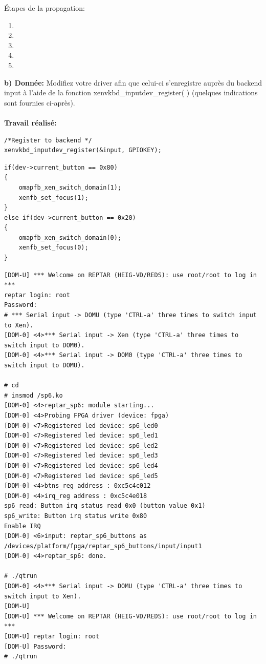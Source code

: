 Étapes de la propagation:
\begin{enumerate}
	\item
	\item
	\item
	\item
	\item
\end{enumerate}
\textbf{b) Donnée: }Modifiez votre driver afin que celui-ci s'enregistre auprès du backend input à l'aide de la fonction
xenvkbd\_inputdev\_register( ) (quelques indications sont fournies ci-après).\\\\
\textbf{Travail réalisé: }
\begin{lstlisting}
/*Register to backend */
xenvkbd_inputdev_register(&input, GPIOKEY);
\end{lstlisting}
\begin{lstlisting}
if(dev->current_button == 0x80)
{
	omapfb_xen_switch_domain(1);
	xenfb_set_focus(1);
}
else if(dev->current_button == 0x20)
{
	omapfb_xen_switch_domain(0);
	xenfb_set_focus(0);
}
\end{lstlisting}
\begin{lstlisting}
[DOM-U] *** Welcome on REPTAR (HEIG-VD/REDS): use root/root to log in ***
reptar login: root
Password: 
# *** Serial input -> DOMU (type 'CTRL-a' three times to switch input to Xen).
[DOM-0] <4>*** Serial input -> Xen (type 'CTRL-a' three times to switch input to DOM0).
[DOM-0] <4>*** Serial input -> DOM0 (type 'CTRL-a' three times to switch input to DOMU).

# cd
# insmod /sp6.ko 
[DOM-0] <4>reptar_sp6: module starting...
[DOM-0] <4>Probing FPGA driver (device: fpga)
[DOM-0] <7>Registered led device: sp6_led0
[DOM-0] <7>Registered led device: sp6_led1
[DOM-0] <7>Registered led device: sp6_led2
[DOM-0] <7>Registered led device: sp6_led3
[DOM-0] <7>Registered led device: sp6_led4
[DOM-0] <7>Registered led device: sp6_led5
[DOM-0] <4>btns_reg address : 0xc5c4c012
[DOM-0] <4>irq_reg address : 0xc5c4e018
sp6_read: Button irq status read 0x0 (button value 0x1)
sp6_write: Button irq status write 0x80
Enable IRQ
[DOM-0] <6>input: reptar_sp6_buttons as /devices/platform/fpga/reptar_sp6_buttons/input/input1
[DOM-0] <4>reptar_sp6: done.

# ./qtrun
[DOM-0] <4>*** Serial input -> DOMU (type 'CTRL-a' three times to switch input to Xen).
[DOM-U] 
[DOM-U] *** Welcome on REPTAR (HEIG-VD/REDS): use root/root to log in ***
[DOM-U] reptar login: root 
[DOM-U] Password: 
# ./qtrun 
\end{lstlisting}
